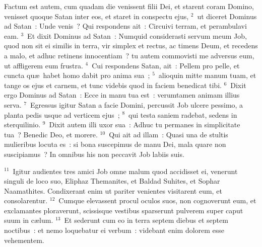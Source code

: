\lettrine[lines=10,image=true,loversize=0.05,lraise=-0.03]{F}{}actum est autem, cum quadam die venissent filii Dei, et starent coram Domino, venisset quoque Satan inter eos, et staret in conspectu ejus,
${}^{2}$~ut diceret Dominus ad Satan~: Unde venis~? Qui respondens ait~: Circuivi terram, et perambulavi eam.
${}^{3}$~Et dixit Dominus ad Satan~: Numquid considerasti servum meum Job, quod non sit ei similis in terra, vir simplex et rectus, ac timens Deum, et recedens a malo, et adhuc retinens innocentiam~? tu autem commovisti me adversus eum, ut affligerem eum frustra.
${}^{4}$~Cui respondens Satan, ait~: Pellem pro pelle, et cuncta qu\ae\ habet homo dabit pro anima sua~;
${}^{5}$~alioquin mitte manum tuam, et tange os ejus et carnem, et tunc videbis quod in faciem benedicat tibi.
${}^{6}$~Dixit ergo Dominus ad Satan~: Ecce in manu tua est~: verumtamen animam illius serva.
${}^{7}$~Egressus igitur Satan a facie Domini, percussit Job ulcere pessimo, a planta pedis usque ad verticem ejus~;
${}^{8}$~qui testa saniem radebat, sedens in sterquilinio.
${}^{9}$~Dixit autem illi uxor sua~: Adhuc tu permanes in simplicitate tua~? Benedic Deo, et morere.
${}^{10}$~Qui ait ad illam~: Quasi una de stultis mulieribus locuta es~: si bona suscepimus de manu Dei, mala quare non suscipiamus~? In omnibus his non peccavit Job labiis suis.


${}^{11}$~Igitur audientes tres amici Job omne malum quod accidisset ei, venerunt singuli de loco suo, Eliphaz Themanites, et Baldad Suhites, et Sophar Naamathites. Condixerant enim ut pariter venientes visitarent eum, et consolarentur.
${}^{12}$~Cumque elevassent procul oculos suos, non cognoverunt eum, et exclamantes ploraverunt, scissisque vestibus sparserunt pulverem super caput suum in c\ae lum.
${}^{13}$~Et sederunt cum eo in terra septem diebus et septem noctibus~: et nemo loquebatur ei verbum~: videbant enim dolorem esse vehementem.

